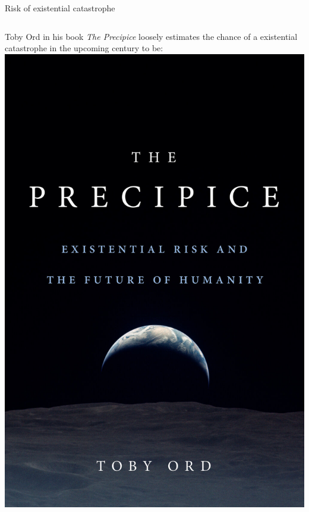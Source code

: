 \documentclass[10pt]{beamer}
\begin{document}
\begin{frame}{Risk of existential catastrophe}
  \begin{columns}[T,onlytextwidth]

    Toby Ord in his book \textit{The Precipice} loosely estimates the chance of a existential catastrophe in the upcoming century to be:  \\
    \centering
  \includegraphics[scale=0.4]{images/precipice.jpg}
  \end{columns}
\end{frame}
\end{document}
